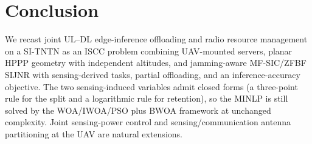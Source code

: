 \documentclass[journal]{IEEEtran}
\begin{document}
\section{Conclusion}
We recast joint UL--DL edge-inference offloading and radio resource management on a SI-TNTN as an ISCC problem combining UAV-mounted servers, planar HPPP geometry with independent altitudes, and jamming-aware MF-SIC/ZFBF SIJNR with sensing-derived tasks, partial offloading, and an inference-accuracy objective. The two sensing-induced variables admit closed forms (a three-point rule for the split and a logarithmic rule for retention), so the MINLP is still solved by the WOA/IWOA/PSO plus BWOA framework at unchanged complexity. Joint sensing-power control and sensing/communication antenna partitioning at the UAV are natural extensions.



\end{document}
